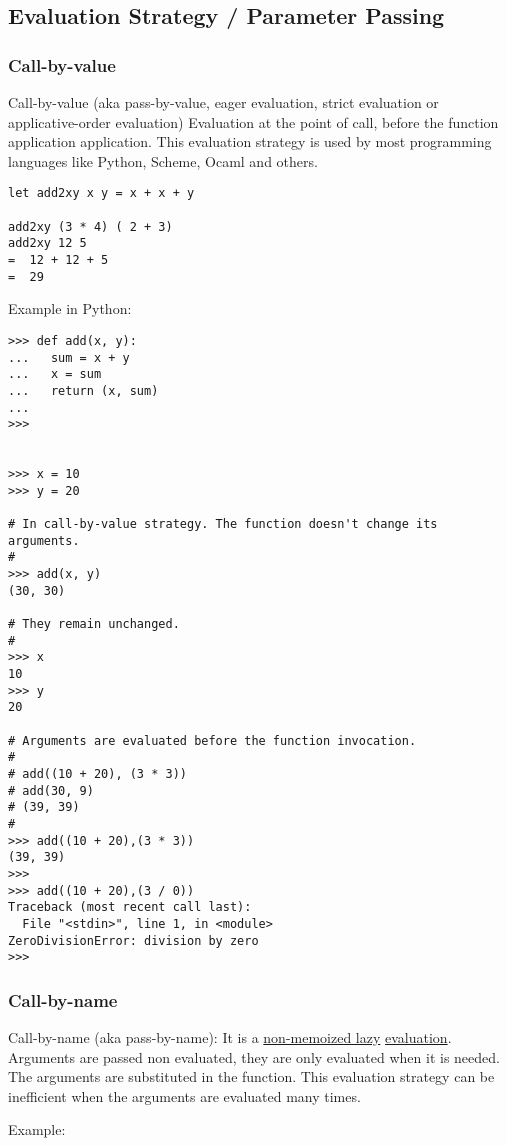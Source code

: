 \documentclass[11pt]{article}
\begin{document}
\subsection{Evaluation Strategy / Parameter Passing}
\label{sec-1-2}
\subsubsection{Call-by-value}
\label{sec-1-2-1}

Call-by-value (aka pass-by-value, eager evaluation, strict evaluation or
applicative-order evaluation) Evaluation at the point of call, before
the function application application. This evaluation strategy is used
by most programming languages like Python, Scheme, Ocaml and others.


\begin{verbatim}
let add2xy x y = x + x + y 

add2xy (3 * 4) ( 2 + 3) 
add2xy 12 5 
=  12 + 12 + 5 
=  29
\end{verbatim}

Example in Python:

\begin{verbatim}
>>> def add(x, y):
...   sum = x + y
...   x = sum 
...   return (x, sum)
... 
>>> 


>>> x = 10
>>> y = 20

# In call-by-value strategy. The function doesn't change its arguments. 
# 
>>> add(x, y)
(30, 30)

# They remain unchanged.
#
>>> x
10
>>> y
20

# Arguments are evaluated before the function invocation.
#
# add((10 + 20), (3 * 3))
# add(30, 9)
# (39, 39)
#
>>> add((10 + 20),(3 * 3))
(39, 39)
>>> 
>>> add((10 + 20),(3 / 0))
Traceback (most recent call last):
  File "<stdin>", line 1, in <module>
ZeroDivisionError: division by zero
>>>
\end{verbatim}

\subsubsection{Call-by-name}
\label{sec-1-2-2}

Call-by-name (aka pass-by-name): It is a \uline{non-memoized lazy}
\uline{evaluation}. Arguments are passed non evaluated, they are only
evaluated when it is needed. The arguments are substituted in the
function. This evaluation strategy can be inefficient when the
arguments are evaluated many times.

Example: 
\end{document}
